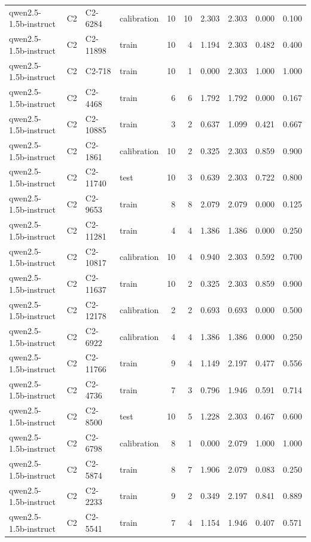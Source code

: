 \begin{table}
\begin{tabular}{llllrrrrrr}
qwen2.5-1.5b-instruct & C2 & C2-6284 & calibration & 10 & 10 & 2.303 & 2.303 & 0.000 & 0.100 \\
qwen2.5-1.5b-instruct & C2 & C2-11898 & train & 10 & 4 & 1.194 & 2.303 & 0.482 & 0.400 \\
qwen2.5-1.5b-instruct & C2 & C2-718 & train & 10 & 1 & 0.000 & 2.303 & 1.000 & 1.000 \\
qwen2.5-1.5b-instruct & C2 & C2-4468 & train & 6 & 6 & 1.792 & 1.792 & 0.000 & 0.167 \\
qwen2.5-1.5b-instruct & C2 & C2-10885 & train & 3 & 2 & 0.637 & 1.099 & 0.421 & 0.667 \\
qwen2.5-1.5b-instruct & C2 & C2-1861 & calibration & 10 & 2 & 0.325 & 2.303 & 0.859 & 0.900 \\
qwen2.5-1.5b-instruct & C2 & C2-11740 & test & 10 & 3 & 0.639 & 2.303 & 0.722 & 0.800 \\
qwen2.5-1.5b-instruct & C2 & C2-9653 & train & 8 & 8 & 2.079 & 2.079 & 0.000 & 0.125 \\
qwen2.5-1.5b-instruct & C2 & C2-11281 & train & 4 & 4 & 1.386 & 1.386 & 0.000 & 0.250 \\
qwen2.5-1.5b-instruct & C2 & C2-10817 & calibration & 10 & 4 & 0.940 & 2.303 & 0.592 & 0.700 \\
qwen2.5-1.5b-instruct & C2 & C2-11637 & train & 10 & 2 & 0.325 & 2.303 & 0.859 & 0.900 \\
qwen2.5-1.5b-instruct & C2 & C2-12178 & calibration & 2 & 2 & 0.693 & 0.693 & 0.000 & 0.500 \\
qwen2.5-1.5b-instruct & C2 & C2-6922 & calibration & 4 & 4 & 1.386 & 1.386 & 0.000 & 0.250 \\
qwen2.5-1.5b-instruct & C2 & C2-11766 & train & 9 & 4 & 1.149 & 2.197 & 0.477 & 0.556 \\
qwen2.5-1.5b-instruct & C2 & C2-4736 & train & 7 & 3 & 0.796 & 1.946 & 0.591 & 0.714 \\
qwen2.5-1.5b-instruct & C2 & C2-8500 & test & 10 & 5 & 1.228 & 2.303 & 0.467 & 0.600 \\
qwen2.5-1.5b-instruct & C2 & C2-6798 & calibration & 8 & 1 & 0.000 & 2.079 & 1.000 & 1.000 \\
qwen2.5-1.5b-instruct & C2 & C2-5874 & train & 8 & 7 & 1.906 & 2.079 & 0.083 & 0.250 \\
qwen2.5-1.5b-instruct & C2 & C2-2233 & train & 9 & 2 & 0.349 & 2.197 & 0.841 & 0.889 \\
qwen2.5-1.5b-instruct & C2 & C2-5541 & train & 7 & 4 & 1.154 & 1.946 & 0.407 & 0.571 \\

\end{tabular}
\end{table}
